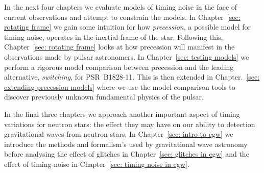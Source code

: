 \documentclass[../full_thesis/full_thesis.tex]{subfiles}
\begin{document}
In the next four chapters we evaluate models of timing noise in the face of
current observations and attempt to constrain the models.  In Chapter~\ref{sec:
rotating frame} we gain some intuition for how \emph{precession}, a possible
model for timing-noise, operates in the inertial frame of the star.  Following
this, Chapter~\ref{sec: rotating frame} looks at how precession will manifest
in the observations made by pulsar astronomers. In Chapter~\ref{sec: testing
models} we perform a rigorous model comparison between precession and the
leading alternative, \emph{switching}, for PSR~B1828-11. This is then extended
in Chapter.~\ref{sec: extending precession models} where we use the model
comparison tools to discover previously unknown fundamental physics of the
pulsar.

In the final three chapters we approach another important aspect of timing
variations for neutron stars: the effect they may have on our ability to
detection gravitational waves from neutron stars. In Chapter~\ref{sec: intro to
cgw} we introduce the methods and formalism's used by gravitational wave
astronomy before analysing the effect of glitches in Chapter~\ref{sec: glitches
in cgw} and the effect of timing-noise in Chapter~\ref{sec: timing noise in
cgw}.

\biblio
\end{document}
